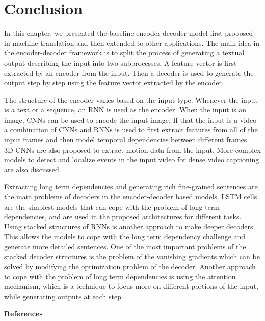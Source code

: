 \documentclass[preprint, 10pt]{elsarticle}
\begin{document}
		\section{Conclusion}
		In this chapter, we presented the baseline encoder-decoder model first proposed in machine translation and then extended to other applications. The main idea in the encoder-decoder framework is to split the process of generating a textual output describing the input into two subprocesses. A feature vector is first extracted by an encoder from the input. Then a decoder is used to generate the output step by step using the feature vector extracted by the encoder. 
		
		The structure of the encoder varies based on the input type. Whenever the input is a text or a sequence, an RNN is used as the encoder. When the input is an image, CNNs can be used to encode the input image. If that the input is a video a combination of CNNs and RNNs is used to first extract features from all of the input frames and then model temporal dependencies between different frames. 3D-CNNs are also proposed to extract motion data from the input. More complex models to detect and localize events in the input video for dense video captioning are also discussed.
		
		Extracting long term dependencies and generating rich fine-grained sentences are the main problems of decoders in the encoder-decoder based models. LSTM cells are the simplest models that can cope with the problem of long term dependencies, and are used in the proposed architectures for different tasks. Using stacked structures of RNNs is another approach to make deeper decoders. This allows the models to cope with the long term dependency challenge and generate more detailed sentences. One of the most important problems of the stacked decoder structures is the problem of the vanishing gradients which can be solved by modifying the optimization problem of the decoder. Another approach to cope with the problem of long term dependencies is using the attention mechanism, which is a technique to focus more on different portions of the input, while generating outputs at each step. 
		\\
		
	\begin{large}
		\textbf{References}
	\end{large}
		
	
	
\end{document}
